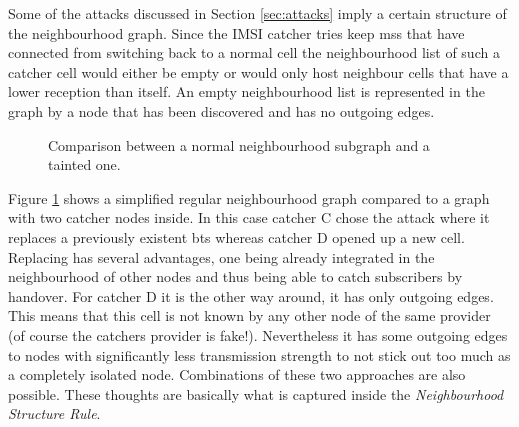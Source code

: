 Some of the attacks discussed in Section \ref{sec:attacks} imply a certain structure of the neighbourhood graph.
Since the IMSI catcher tries keep \glspl{ms} that have connected from switching back to a normal cell the neighbourhood list of such a catcher cell would either be empty or would only host neighbour cells that have a lower reception than itself.
An empty neighbourhood list is represented in the graph by a node that has been discovered and has no outgoing edges.
\begin{figure}
\centering
{}
\caption{Comparison between a normal neighbourhood subgraph and a tainted one.}
\label{fig:structure_comparison}
\end{figure}
Figure \ref{fig:structure_comparison} shows a simplified regular neighbourhood graph compared to a graph with two catcher nodes inside.
In this case catcher C chose the attack where it replaces a previously existent \gls{bts} whereas catcher D opened up a new cell.
Replacing has several advantages, one being already integrated in the neighbourhood of other nodes and thus being able to catch subscribers by handover.
For catcher D it is the other way around, it has only outgoing edges.
This means that this cell is not known by any other node of the same provider (of course the catchers provider is fake!).
Nevertheless it has some outgoing edges to nodes with significantly less transmission strength to not stick out too much as a completely isolated node.
Combinations of these two approaches are also possible.
These thoughts are basically what is captured inside the \emph{Neighbourhood Structure Rule}.

